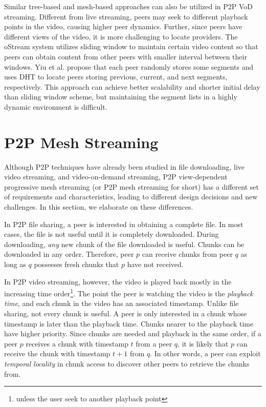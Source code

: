Similar tree-based and mesh-based approaches can also be utilized in
P2P VoD streaming. Different from live streaming, peers
may seek to different playback points in the video, causing
higher peer dynamics. 
Further, since peers have different views of the video, it is more challenging
to locate providers. The oStream \cite{cui:ostream} system
utilizes sliding window to maintain certain video content so that
peers can obtain content from other peers with smaller interval
between their windows. Yiu et al. \cite{yiu:distributed} propose that
each peer randomly stores some segments and uses DHT to locate peers
storing previous, current, and next segments, respectively. This
approach can achieve better scalability and shorter initial delay than
sliding window scheme, but maintaining the segment
lists in a highly dynamic environment is difficult.
   
\section{P2P Mesh Streaming}
\label{s:comp}

    Although P2P techniques have already been studied in
    file downloading, live video streaming, and
    video-on-demand streaming, P2P view-dependent
    progressive mesh streaming (or P2P mesh streaming for
    short) has a different set of requirements and
    characteristics, leading to different design decisions and
    new challenges.
    In this section, we elaborate on these differences.

    In P2P file sharing, a peer is interested in obtaining a
    complete file.  In most cases, the file is not useful
    until it is completely downloaded.  During downloading,
    \textit{any} new chunk of the file downloaded is useful.
    Chunks can be downloaded in any order.
    Therefore, peer $p$ can receive chunks from peer $q$ as
    long as $q$ possesses fresh chunks that $p$ have
    not received.

    In P2P video streaming, however, the video is played
    back mostly in the increasing time order\footnote{unless the
    user seek to another playback point}.  The point the
    peer is watching the video is the \textit{playback
    time}, and each chunk in the video has an associated
    timestamp.  Unlike file sharing, not every chunk is
    useful.  A peer is only interested in a chunk whose
    timestamp is later than the playback time.  Chunks
    nearer to the playback time have higher priority.  
    Since chunks are
    needed and playback in the same order, if a peer $p$
    receives a chunk with timestamp $t$ from a peer $q$, it
    is likely that $p$ can receive the chunk with timestamp
    $t+1$ from $q$.  In other words, a peer can exploit
    \textit{temporal locality} in chunk access to discover
    other peers to retrieve the chunks from.

